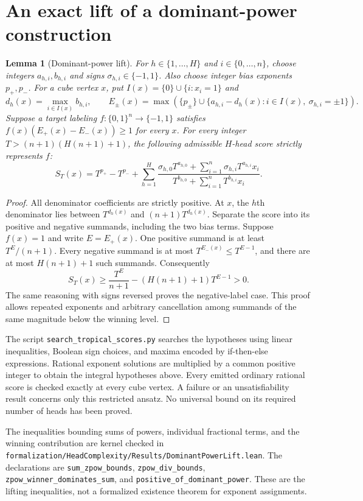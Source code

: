 \documentclass[11pt]{article}
\newtheorem{lemma}[proposition]{Lemma}
\newcommand{\Qn}{\{0,1\}^n}
\begin{document}
\section{An exact lift of a dominant-power construction}

\begin{lemma}[Dominant-power lift]
For $h\in\{1,\ldots,H\}$ and $i\in\{0,\ldots,n\}$, choose integers
$a_{h,i},b_{h,i}$ and signs $\sigma_{h,i}\in\{-1,1\}$.
Also choose integer bias exponents $p_+,p_-$. For a cube vertex $x$,
put $I(x)=\{0\}\cup\{i:x_i=1\}$ and
\[
 d_h(x)=\max_{i\in I(x)} b_{h,i},\qquad
 E_\pm(x)=\max\left(\{p_\pm\}\cup
 \{a_{h,i}-d_h(x):i\in I(x),\ \sigma_{h,i}=\pm1\}\right).
\]
Suppose a target labeling $f:\Qn\to\{-1,1\}$ satisfies
$f(x)(E_+(x)-E_-(x))\ge1$ for every $x$.
For every integer $T>(n+1)(H(n+1)+1)$, the following admissible
$H$-head score strictly represents $f$:
\[
 S_T(x)=T^{p_+}-T^{p_-}+\sum_{h=1}^H
 \frac{\sigma_{h,0}T^{a_{h,0}}+
          \sum_{i=1}^n\sigma_{h,i}T^{a_{h,i}}x_i}
      {T^{b_{h,0}}+\sum_{i=1}^nT^{b_{h,i}}x_i}.
\]
\end{lemma}
\begin{proof}
All denominator coefficients are strictly positive. At $x$, the
$h$th denominator lies between $T^{d_h(x)}$ and
$(n+1)T^{d_h(x)}$. Separate the score into its positive and negative
summands, including the two bias terms. Suppose $f(x)=1$ and write
$E=E_+(x)$. One positive summand is at least $T^E/(n+1)$.
Every negative summand is at most $T^{E_-(x)}\le T^{E-1}$,
and there are at most $H(n+1)+1$ such summands. Consequently
\[
 S_T(x)\ge \frac{T^E}{n+1}-(H(n+1)+1)T^{E-1}>0.
\]
The same reasoning with signs reversed proves the negative-label case.
This proof allows repeated exponents and arbitrary cancellation among
summands of the same magnitude below the winning level.
\end{proof}

The script \texttt{search\_tropical\_scores.py} searches the hypotheses
using linear inequalities, Boolean sign choices, and maxima encoded by
if-then-else expressions. Rational exponent solutions are multiplied by
a common positive integer to obtain the integral hypotheses above.
Every emitted ordinary rational score is checked exactly at every cube
vertex. A failure or an unsatisfiability result concerns only this
restricted ansatz. No universal bound on its required number of heads
has been proved.

The inequalities bounding sums of powers, individual fractional terms,
and the winning contribution are kernel checked in
\texttt{formalization/HeadComplexity/Results/DominantPowerLift.lean}.
The declarations are \texttt{sum\_zpow\_bounds},
\texttt{zpow\_div\_bounds}, \texttt{zpow\_winner\_dominates\_sum}, and
\texttt{positive\_of\_dominant\_power}. These are the lifting inequalities,
not a formalized existence theorem for exponent assignments.
\end{document}
